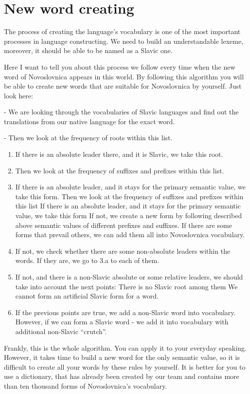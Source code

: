 \section{New word creating}

The process of creating the language’s vocabulary is one of the most important processes in language constructing. We need to build an understandable lexeme, moreover, it should be able to be named as a Slavic one. 

Here I want to tell you about this process we follow every time when the new word of Novoslovnica appears in this world. By following this algorithm you will be able to create new words that are suitable for Novoslovnica by yourself. Just look here:

- We are looking through the vocabularies of Slavic languages and find out the translations from our native language for the exact word.

- Then we look at the frequency of roots within this list.

\begin{enumerate}
	\item If there is an absolute leader there, and it is Slavic, we take this root.
	\item Then we look at the frequency of suffixes and prefixes within this list.
	\item If there is an absolute leader, and it stays for the primary semantic value, we take this form.
	\subitem Then we look at the frequency of suffixes and prefixes within this list
	\subitem If there is an absolute leader, and it stays for the primary semantic value, we take this form
	\subitem If not, we create a new form by following described above semantic values of different prefixes and suffixes.
	\subitem If there are some forms that prevail others, we can add them all into Novoslovnica vocabulary.
	\item If not, we check whether there are some non-absolute leaders within the words. If they are, we go to 3.a to each of them.
	\item If not, and there is a non-Slavic absolute or some relative leaders, we should take into account the next points:
	\subitem There is no Slavic root among them
	\subitem We cannot form an artificial Slavic form for a word.
	\item If the previous points are true, we add a non-Slavic word into vocabulary. However, if we can form a Slavic word - we add it into vocabulary with additional non-Slavic “crutch”. 
\end{enumerate}

Frankly, this is the whole algorithm. You can apply it to your everyday speaking. However, it takes time to build a new word for the only semantic value, so it is difficult to create all your words by these rules by yourself. It is better for you to use a dictionary, that has already been created by our team and contains more than ten thousand forms of Novoslovnica’s vocabulary. 